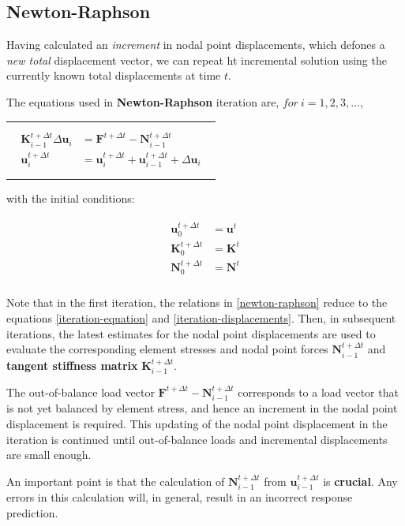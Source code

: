 \documentclass[10pt,b5paper,titlepage]{book}
\newcommand{\m}{\mathbf}
\newenvironment{bbox}[1][0.96]
{
    \begin{center}
        \begin{tabular}{|p{#1\textwidth}|}
            \hline\\
}
{
            \\\\\hline
        \end{tabular}
    \end{center}
}
\newenvironment{eqarray}
{
    \begin{eqnarray}
        \begin{aligned}
}
{
        \end{aligned}
    \end{eqnarray}
}
\begin{document}
\subsection{Newton-Raphson}
Having calculated an \textit{increment} in nodal point displacements, which defones
a \textit{new total} displacement vector, we can repeat ht incremental solution
using the currently known total displacements at time $ t $.

The equations used in \textbf{Newton-Raphson} iteration are, $ for\ i = 1, 2, 3, \dots, $

\begin{bbox}
    \begin{eqarray}\label{newton-raphson}
        \m{K}_{i-1}^{t + \Delta t} \Delta \m{u}_i &=
        \m{F}^{t + \Delta t} - \m{N}_{i - 1}^{t + \Delta t} \\
        \m{u}_{i}^{t+\Delta t} &=  \m{u}_{i}^{t + \Delta t} +
        \m{u}_{i-1}^{t+\Delta t} + \Delta \m{u}_i
    \end{eqarray}
\end{bbox}

with the initial conditions:

\begin{eqarray}
    \m{u}_{0}^{t + \Delta t} &= \m{u}^t \\
    \m{K}_{0}^{t + \Delta t} &= \m{K}^t \\
    \m{N}_{0}^{t + \Delta t} &= \m{N}^t \\
\end{eqarray}

Note that in the first iteration, the relations in \eqref{newton-raphson}
reduce to the equations \eqref{iteration-equation} and \eqref{iteration-displacements}.
Then, in subsequent iterations, the latest estimates for the nodal point
displacements are used to evaluate the corresponding element stresses and
nodal point forces $ \m{N}_{i-1}^{t + \Delta t} $ and
\textbf{tangent stiffness matrix} $ \m{K}_{i-1}^{t + \Delta t} $.

The out-of-balance load vector $ \m{F}^{t + \Delta t} - \m{N}_{i-1}^{t + \Delta t} $
corresponds to a load vector that is not yet balanced by element stress, and
hence an increment in the nodal point displacement is required. This updating of the
nodal point displacement in the iteration is continued until out-of-balance loads
and incremental displacements are small enough.

An important point is that the calculation of $ \m{N}_{i-1}^{t + \Delta t} $
from $ \m{u}_{i-1}^{t + \Delta t} $ is \textbf{crucial}. Any errors in this
calculation will, in general, result in an incorrect response prediction.
\end{document}
